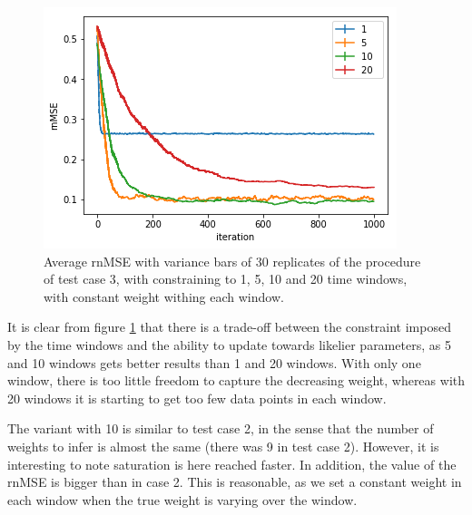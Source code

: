 \begin{figure}[hbt!]
\caption{Average rnMSE with variance bars of 30 replicates of the procedure of test case 3, with constraining to 1, 5, 10 and 20 time windows, with constant weight withing each window.}
\label{fig:MSE_bins}
    \centering
    \includegraphics[scale=0.8]{fig/MSE_bins_2.png}
\end{figure}


It is clear from figure \ref{fig:MSE_bins} that there is a trade-off between the constraint imposed by the time windows and the ability to update towards likelier parameters, as 5 and 10 windows gets better results than 1 and 20 windows. With only one window, there is too little freedom to capture the decreasing weight, whereas with 20 windows it is starting to get too few data points in each window. 

The variant with 10 is similar to test case 2, in the sense that the number of weights to infer is almost the same (there was 9 in test case 2). However, it is interesting to note saturation is here reached faster. In addition, the value of the rnMSE is bigger than in case 2. This is reasonable, as we set a constant weight in each window when the true weight is varying over the window. 





\cleardoublepage